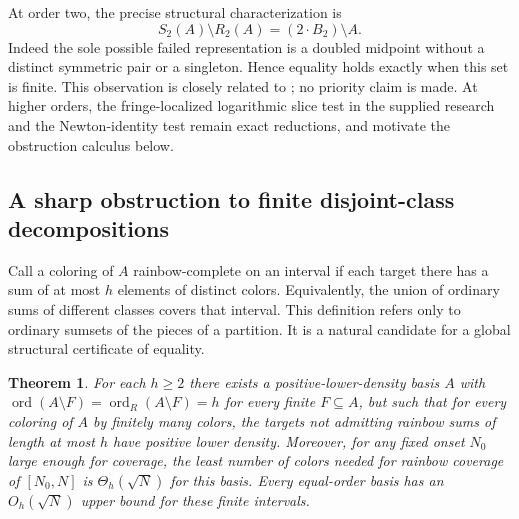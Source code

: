 \documentclass[11pt]{article}
\newtheorem{theorem}{Theorem}[section]
\theoremstyle{remark}\newtheorem{remark}[theorem]{Remark}
\newcommand{\ord}{\operatorname{ord}}
\newcommand{\ordR}{\operatorname{ord}_{R}}
\begin{document}
At order two, the precise structural characterization is
\[S_2(A)\setminus R_2(A)=(2\cdot B_2)\setminus A.\]
Indeed the sole possible failed representation is a doubled midpoint without a distinct symmetric pair or a singleton. Hence equality holds exactly when this set is finite. This observation is closely related to \cite{Heg}; no priority claim is made. At higher orders, the fringe-localized logarithmic slice test in the supplied research and the Newton-identity test remain exact reductions, and motivate the obstruction calculus below.

\subsection{A sharp obstruction to finite disjoint-class decompositions}
Call a coloring of $A$ rainbow-complete on an interval if each target there has a sum of at most $h$ elements of distinct colors. Equivalently, the union of ordinary sums of different classes covers that interval. This definition refers only to ordinary sumsets of the pieces of a partition. It is a natural candidate for a global structural certificate of equality.
\begin{theorem}\label{color}
For each $h\ge2$ there exists a positive-lower-density basis $A$ with $\ord(A\setminus F)=\ordR(A\setminus F)=h$ for every finite $F\subseteq A$, but such that for every coloring of $A$ by finitely many colors, the targets not admitting rainbow sums of length at most $h$ have positive lower density. Moreover, for any fixed onset $N_0$ large enough for coverage, the least number of colors needed for rainbow coverage of $[N_0,N]$ is $\Theta_h(\sqrt N)$ for this basis. Every equal-order basis has an $O_h(\sqrt N)$ upper bound for these finite intervals.
\end{theorem}
\end{document}
